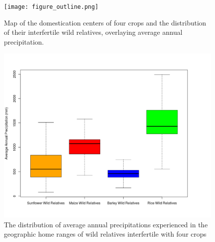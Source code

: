 \documentclass[11pt]{article}
\newcommand{\gmj}[1]{\textcolor{blue}{ \emph{\scriptsize  #1}} } %
\begin{document}
\begin{figure}[h]
	\centering
	\texttt{[image: figure\_outline.png]}
	\caption{Map of the domestication centers of four crops and the distribution of their interfertile wild relatives, overlaying average annual precipitation.}
	\label{boxplot:map}
\end{figure}

\begin{figure}[h]
	\centering
	\includegraphics[width=17.35cm]{boxplot.png}
	\caption{The distribution of average annual precipitations experienced in the geographic home ranges of wild relatives interfertile with four crops}
	\label{fig:map}
\end{figure}








\end{document}
